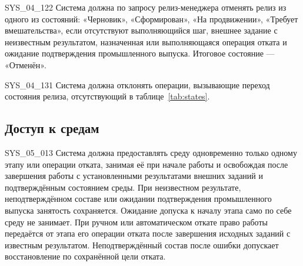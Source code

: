 \documentclass{tpks}
\begin{document}
\begin{req}{SYS_04_12}{2}
Система должна по запросу релиз-менеджера отменять релиз из одного из состояний:
«Черновик», «Сформирован», «На продвижении», «Требует вмешательства», если отсутствуют
выполняющийся шаг, внешнее задание с неизвестным результатом, назначенная или
выполняющаяся операция отката и ожидание подтверждения промышленного выпуска.
Итоговое состояние --- «Отменён».
\end{req}

\begin{req}{SYS_04_13}{1}
Система должна отклонять операции, вызывающие переход состояния релиза, отсутствующий в таблице~\ref{tab:states}.
\end{req}

\subsection{Доступ к средам}

\begin{req}{SYS_05_01}{3}
Система должна предоставлять среду одновременно только одному этапу или операции отката,
занимая её при начале работы и освобождая после завершения работы с установленными
результатами внешних заданий и подтверждённым состоянием среды.
При неизвестном результате, неподтверждённом составе или ожидании подтверждения
промышленного выпуска занятость сохраняется. Ожидание допуска к началу этапа
само по себе среду не занимает.
При ручном или автоматическом откате право работы передаётся от этапа его операции
отката после завершения исходных заданий с известным результатом. Неподтверждённый
состав после ошибки допускает восстановление по сохранённой цели отката.
\end{req}
\end{document}
